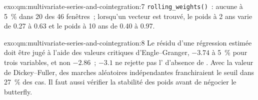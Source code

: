\begin{solution}{exo:qm:multivariate-series-and-cointegration:7}
\texttt{rolling\_weights()}~: aucune  à 5~\% dans 20 des 46 fenêtres~; lorsqu'un vecteur est trouvé, le poids à 2 ans varie de 0.27 à 0.63 et le poids à 10 ans
de 0.40 à 0.97.
\end{solution}

\begin{solution}{exo:qm:multivariate-series-and-cointegration:8}
Le résidu d'une régression estimée doit être jugé à l'aide des valeurs critiques d'Engle--Granger, $-3.74$ à 5~\% pour trois variables, et non $-2.86$~; $-3.1$ ne rejette pas
l' d'absence de . Avec la valeur de Dickey--Fuller, des marches aléatoires indépendantes franchiraient le seuil dans 27~\% des cas. Il faut aussi vérifier la stabilité des poids avant
de négocier le butterfly.
\end{solution}

